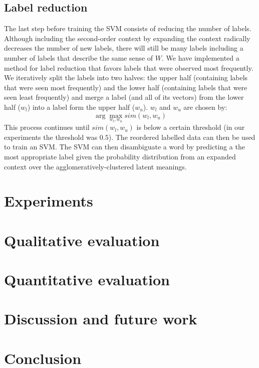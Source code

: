 \documentclass[11pt]{article}
\begin{document}
\subsection{Label reduction}
The last step before training the SVM consists of reducing the number of labels. Although including the second-order context by expanding the context radically decreases the number of new labels, there will still be many labels including a number of labels that describe the same sense of $W$. We have implemented a method for label reduction that favors labels that were observed most frequently. We iteratively split the labels into two halves: the upper half (containing labels that were seen most frequently) and the lower half (containing labels that were seen least frequently) and merge a label (and all of its vectors) from the lower half ($w_l$) into a label form the upper half ($w_u$). $w_l$ and $w_u$ are chosen by: 
$$\arg\max_{w_l, w_u} \textit{sim}(w_l, w_u)$$
This process continues until $\textit{sim}(w_l, w_u)$ is below a certain threshold (in our experiments the threshold was $0.5$).
The reordered labelled data can then be used to train an SVM. The SVM can then disambiguate a word by predicting a the most appropriate label given the probability distribution from an expanded context over the agglomeratively-clustered latent meanings. 

\section{Experiments}

\section{Qualitative evaluation}

\section{Quantitative evaluation}

\section{Discussion and future work}
\section{Conclusion}



\end{document}

